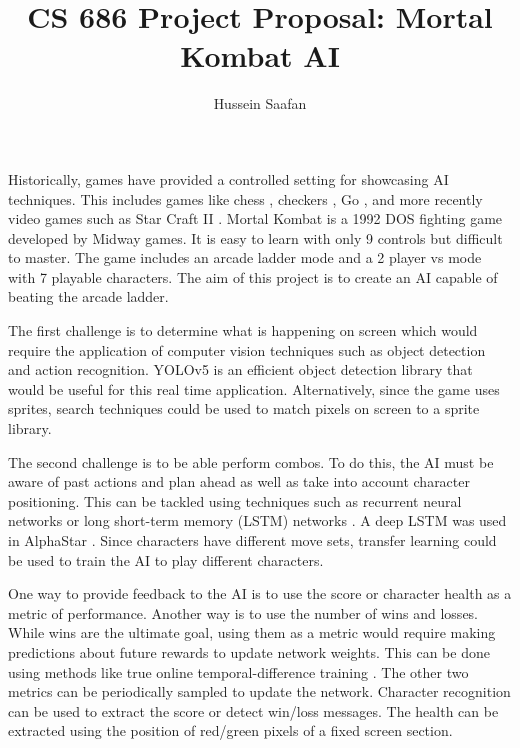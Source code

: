 \documentclass[12pt,a4paper, twocolumn]{article}
\author{Hussein Saafan}
\title{\vspace{-3cm}CS 686 Project Proposal: Mortal Kombat AI}
\begin{document}
\maketitle
Historically, games have provided a controlled setting for showcasing AI techniques.
This includes games like chess \cite{hsu2002behind}, checkers \cite{schaeffer2007checkers}, Go \cite{silver2017mastering}, and more recently video games such as Star Craft II \cite{vinyals2019grandmaster}.
Mortal Kombat is a 1992 DOS fighting game developed by Midway games.
It is easy to learn with only 9 controls but difficult to master.
The game includes an arcade ladder mode and a 2 player vs mode with 7 playable characters.
The aim of this project is to create an AI capable of beating the arcade ladder.

The first challenge is to determine what is happening on screen which would require the application of computer vision techniques such as object detection \cite{liu2020deep} and action recognition\cite{zhang2019comprehensive}.
YOLOv5 \cite{glennjocher2022} is an efficient object detection library that would be useful for this real time application.
Alternatively, since the game uses sprites, search techniques could be used to match pixels on screen to a sprite library.

The second challenge is to be able perform combos.
To do this, the AI must be aware of past actions and plan ahead as well as take into account character positioning.
This can be tackled using techniques such as recurrent neural networks or long short-term memory (LSTM) networks \cite{lipton2015critical}.
A deep LSTM was used in AlphaStar \cite{vinyals2019grandmaster}.
Since characters have different move sets, transfer learning \cite{zhuang2020comprehensive} could be used to train the AI to play different characters. 

One way to provide feedback to the AI is to use the score or character health as a metric of performance.
Another way is to use the number of wins and losses.
While wins are the ultimate goal, using them as a metric would require making predictions about future rewards to update network weights.
This can be done using methods like true online temporal-difference training \cite{van2016true}.
The other two metrics can be periodically sampled to update the network.
Character recognition \cite{islam2017survey} can be used to extract the score or detect win/loss messages.
The health can be extracted using the position of red/green pixels of a fixed screen section.
\end{document}
